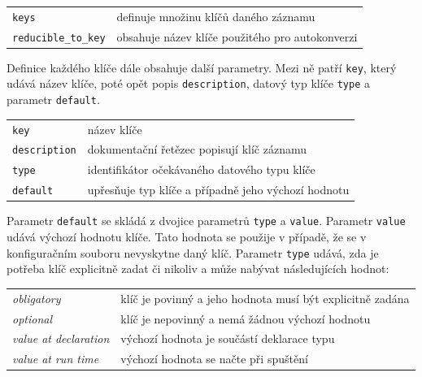\documentclass[FM,bw,DP]{tulthesis}
\begin{document}
\vspace{0.5cm}
\begin{tabular}{m{4cm}@{}l}
\texttt{keys}\dotfill & definuje množinu klíčů daného záznamu \\
\texttt{reducible\_to\_key}\dotfill & obsahuje název klíče použitého pro autokonverzi \\
\end{tabular}
\vspace{0.5cm}

Definice každého klíče dále obsahuje další parametry. Mezi ně patří \texttt{key}, který udává název klíče, poté opět popis \texttt{description}, datový typ klíče \texttt{type} a parametr \texttt{default}.

\vspace{0.5cm}
\begin{tabular}{m{4cm}@{}l}
\texttt{key}\dotfill & název klíče \\
\texttt{description}\dotfill & dokumentační řetězec popisují klíč záznamu \\
\texttt{type}\dotfill & identifikátor očekávaného datového typu klíče \\
\texttt{default}\dotfill & upřesňuje typ klíče a případně jeho výchozí hodnotu \\
\end{tabular}
\vspace{0.5cm}

Parametr \texttt{default} se skládá z dvojice parametrů \texttt{type} a \texttt{value}. Parametr \texttt{value} udává výchozí hodnotu klíče. Tato hodnota se použije v případě, že se v konfiguračním souboru nevyskytne daný klíč. Parametr \texttt{type} udává, zda je potřeba klíč explicitně zadat či nikoliv a může nabývat následujících hodnot:

\vspace{0.5cm}
\begin{tabular}{m{4cm}@{}l}
\textit{obligatory}\dotfill & klíč je povinný a jeho hodnota musí být explicitně zadána \\
\textit{optional}\dotfill & klíč je nepovinný a nemá žádnou výchozí hodnotu \\
\textit{value at declaration}\dotfill & výchozí hodnota je součástí deklarace typu \\
\textit{value at run time}\dotfill & výchozí hodnota se načte při spuštění \\
\end{tabular}
\vspace{0.5cm}
\end{document}
